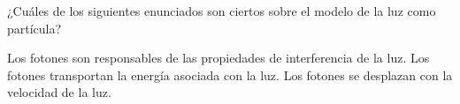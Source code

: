 ¿Cuáles de los siguientes enunciados son ciertos sobre el modelo de la luz como partícula?


\begin{checkboxes}
    \choice Los fotones son responsables de las propiedades de interferencia de la luz.
    \CorrectChoice Los fotones transportan la energía asociada con la luz.
    \CorrectChoice Los fotones se desplazan con la velocidad de la luz.
\end{checkboxes}
